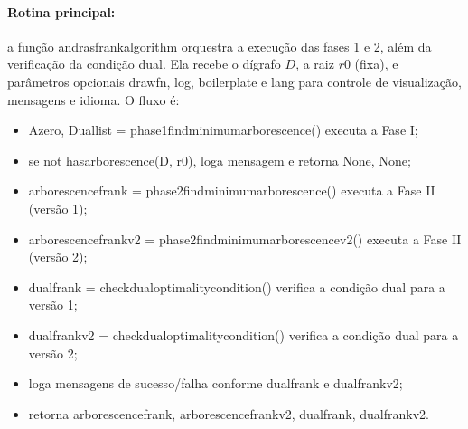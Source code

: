 \documentclass[12pt,a4paper]{article}
\def\texttt#1{#1}%
\def\_{}%
\begin{document}
\paragraph{Rotina principal:}
a função \texttt{andras\_frank\_algorithm} orquestra a execução das fases 1 e 2, além da verificação da condição dual. Ela recebe o dígrafo \(D\), a raiz \(r0\) (fixa), e parâmetros opcionais \texttt{draw\_fn}, \texttt{log}, \texttt{boilerplate} e \texttt{lang} para controle de visualização, mensagens e idioma. O fluxo é:

\begin{itemize}\setlength{\itemsep}{1pt}
    \item \texttt{A\_zero, Dual\_list = phase1\_find\_minimum\_arborescence()} executa a Fase I;
    \item se \texttt{not has\_arborescence(D, r0)}, loga mensagem e retorna \texttt{None, None};
    \item \texttt{arborescence\_frank = phase2\_find\_minimum\_arborescence()} executa a Fase II (versão 1);
    \item \texttt{arborescence\_frank\_v2 = phase2\_find\_minimum\_arborescence\_v2()} executa a Fase II (versão 2);
    \item \texttt{dual\_frank = check\_dual\_optimality\_condition()} verifica a condição dual para a versão 1;
    \item \texttt{dual\_frank\_v2 = check\_dual\_optimality\_condition()} verifica a condição dual para a versão 2;
    \item loga mensagens de sucesso/falha conforme \texttt{dual\_frank} e \texttt{dual\_frank\_v2};
    \item retorna \texttt{arborescence\_frank, arborescence\_frank\_v2, dual\_frank, dual\_frank\_v2}.
\end{itemize}
\end{document}
